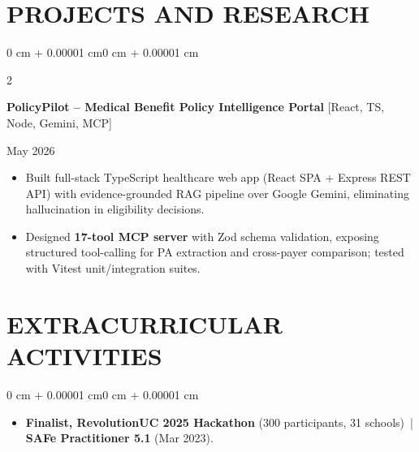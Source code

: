 \documentclass[10pt, letterpaper]{article}
\newenvironment{highlights}{
    \begin{itemize}[
        topsep=0.10 cm,
        parsep=0.06 cm,
        partopsep=0pt,
        itemsep=0.06 cm,
        leftmargin=12pt
    ]
}{
    \end{itemize}
}
\newenvironment{onecolentry}{
    \begin{adjustwidth}{0 cm + 0.00001 cm}{0 cm + 0.00001 cm}
}{
    \end{adjustwidth}
}
\newenvironment{twocolentry}[2][]{
    \onecolentry
    \def\secondColumn{#2}
    \setcolumnwidth{\fill, 4.5 cm}
    \begin{paracol}{2}
}{
    \switchcolumn \raggedleft \secondColumn
    \end{paracol}
    \endonecolentry
}
\begin{document}
\section{PROJECTS AND RESEARCH}
\begin{twocolentry}{May 2026}
\textbf{PolicyPilot -- Medical Benefit Policy Intelligence Portal} [React, TS, Node, Gemini, MCP]
\end{twocolentry}
\begin{highlights}
  \item Built full-stack TypeScript healthcare web app (React SPA + Express REST API) with evidence-grounded RAG pipeline over Google Gemini, eliminating hallucination in eligibility decisions.
  \item Designed \textbf{17-tool MCP server} with Zod schema validation, exposing structured tool-calling for PA extraction and cross-payer comparison; tested with Vitest unit/integration suites.
\end{highlights}

\section{EXTRACURRICULAR ACTIVITIES}
\begin{onecolentry}
\begin{highlights}
  \item \textbf{Finalist, RevolutionUC 2025 Hackathon} (300 participants, 31 schools) \,|\, \textbf{SAFe Practitioner 5.1} (Mar 2023).
\end{highlights}
\end{onecolentry}
\end{document}
